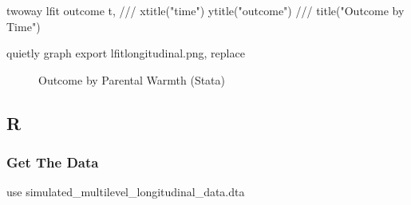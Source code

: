 \documentclass[
  letterpaper,
  DIV=11,
  numbers=noendperiod]{scrreprt}
\newenvironment{Shaded}{\begin{snugshade}}{\end{snugshade}}
\newcommand{\BaseNTok}[1]{\textcolor[rgb]{0.68,0.00,0.00}{#1}}
\newcommand{\CommentTok}[1]{\textcolor[rgb]{0.37,0.37,0.37}{#1}}
\newcommand{\KeywordTok}[1]{\textcolor[rgb]{0.00,0.23,0.31}{#1}}
\newcommand{\NormalTok}[1]{\textcolor[rgb]{0.00,0.23,0.31}{#1}}
\newcommand{\StringTok}[1]{\textcolor[rgb]{0.13,0.47,0.30}{#1}}
\begin{document}
\begin{Shaded}
\begin{Highlighting}[]
\KeywordTok{twoway} \KeywordTok{lfit}\NormalTok{ outcome t, }\CommentTok{///}
  \BaseNTok{xtitle}\NormalTok{(}\StringTok{"time"}\NormalTok{) }\BaseNTok{ytitle}\NormalTok{(}\StringTok{"outcome"}\NormalTok{) }\CommentTok{///}
  \BaseNTok{title}\NormalTok{(}\StringTok{"Outcome by Time"}\NormalTok{) }

\KeywordTok{quietly} \KeywordTok{graph} \KeywordTok{export}\NormalTok{ lfitlongitudinal.png, }\KeywordTok{replace}
\end{Highlighting}
\end{Shaded}

\begin{figure}


\caption{\label{fig-Statalongitudinal}Outcome by Parental Warmth
(Stata)}

\end{figure}%

\subsection{R}

\subsubsection{Get The Data}\label{get-the-data-4}

\begin{Shaded}
\begin{Highlighting}[]

\KeywordTok{use}\NormalTok{ simulated\_multilevel\_longitudinal\_data.dta}
\end{Highlighting}
\end{Shaded}
\end{document}
